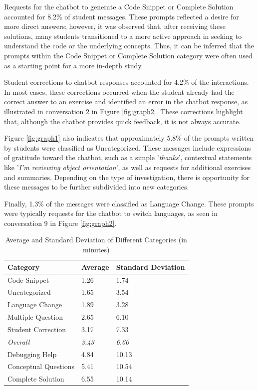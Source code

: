 \documentclass[a4paper,twoside]{article}
\begin{document}
Requests for the chatbot to generate a Code Snippet or Complete Solution accounted
for 8.2\% of student messages. These prompts reflected a desire for more
direct answers; however, it was observed that, after receiving these solutions,
many students transitioned to a more active approach in seeking to understand
the code or the underlying concepts. Thus, it can be inferred that the prompts
within the Code Snippet or Complete Solution category were often used as a
starting point for a more in-depth study.

Student corrections to chatbot responses accounted for 4.2\% of the interactions.
In most cases, these corrections occurred when the student already had the
correct answer to an exercise and identified an error in the chatbot response,
as illustrated in conversation 2 in Figure \ref{fig:graph2}. These corrections
highlight that, although the chatbot provides quick feedback, it is not always
accurate.

Figure \ref{fig:graph1} also indicates that approximately 5.8\% of the prompts
written by students were classified as Uncategorized. These messages include
expressions of gratitude toward the chatbot, such as a simple '\textit{thanks}',
contextual statements like '\textit{I'm reviewing object orientation}', as well
as requests for additional exercises and summaries. Depending on the type of
investigation, there is opportunity for these messages to be further subdivided
into new categories.

Finally, 1.3\% of the messages were classified as Language Change. These prompts
were typically requests for the chatbot to switch languages, as seen in
conversation 9 in Figure \ref{fig:graph2}.

\begin{table}[htbp]
  \caption{Average and Standard Deviation of Different Categories (in minutes)}
  \begin{center}
    \renewcommand{\arraystretch}{1.6} %
    \begin{tabular}{p{4cm} p{4cm} p{4cm}} %
      \hline
      \textbf{Category} & \textbf{Average} & \textbf{Standard Deviation} \\
      \hline
      Code Snippet & 1.26 & 1.74 \\
      Uncategorized & 1.65 & 3.54 \\
      Language Change & 1.89 & 3.28 \\
      Multiple Question & 2.65 & 6.10 \\
      Student Correction & 3.17 & 7.33 \\
      \hdashline
      \textit{Overall} & \textit{3.43} & \textit{6.60} \\
      \hdashline
      Debugging Help & 4.84 & 10.13 \\
      Conceptual Questions & 5.41 & 10.54 \\
      Complete Solution & 6.55 & 10.14 \\
      \hline
    \end{tabular}
    \label{tab:averages}
  \end{center}
\end{table}
\end{document}
